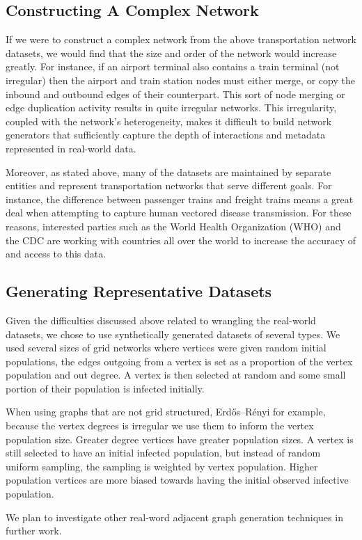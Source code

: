 \subsection{Constructing A Complex Network}

If we were to construct a complex network from the above transportation network datasets, we would find that the size and order of the network would increase greatly. For instance, if an airport terminal also contains a train terminal (not irregular) then the airport and train station nodes must either merge, or copy the inbound and outbound edges of their counterpart. This sort of node merging or edge duplication activity results in quite irregular networks. This irregularity, coupled with the network's heterogeneity, makes it difficult to build network generators that sufficiently capture the depth of interactions and metadata represented in real-world data.

Moreover, as stated above, many of the datasets are maintained by separate entities and represent transportation networks that serve different goals. For instance, the difference between passenger trains and freight trains means a great deal when attempting to capture human vectored disease transmission. For these reasons, interested parties such as the World Health Organization (WHO) and the CDC are working with countries all over the world to increase the accuracy of and access to this data.

\subsection{Generating Representative Datasets}
Given the difficulties discussed above related to wrangling the real-world datasets, we chose to use synthetically generated datasets of several types. We used several sizes of grid networks where vertices were given random initial populations, the edges outgoing from a vertex is set as a proportion of the vertex population and out degree. A vertex is then selected at random and some small portion of their population is infected initially.

When using graphs that are not grid structured, Erdős–Rényi for example, because the vertex degrees is irregular we use them to inform the vertex population size. Greater degree vertices have greater population sizes. A vertex is still selected to have an initial infected population, but instead of random uniform sampling, the sampling is weighted by vertex population. Higher population vertices are more biased towards having the initial observed infective population. 

We plan to investigate other real-word adjacent graph generation techniques in further work.